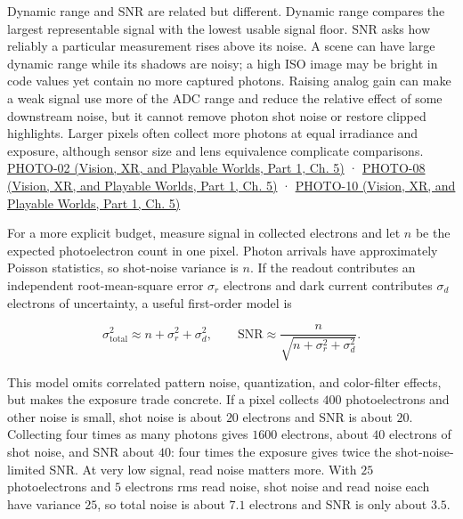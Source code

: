 Dynamic range and SNR are related but different. Dynamic range compares the largest representable signal with the lowest usable signal floor. SNR asks how reliably a particular measurement rises above its noise. A scene can have large dynamic range while its shadows are noisy; a high ISO image may be bright in code values yet contain no more captured photons. Raising analog gain can make a weak signal use more of the ADC range and reduce the relative effect of some downstream noise, but it cannot remove photon shot noise or restore clipped highlights. Larger pixels often collect more photons at equal irradiance and exposure, although sensor size and lens equivalence complicate comparisons. \href{../07-Vision-XR-and-Playable-Worlds-P01/main.pdf\#nameddest=04-visual-computing-ii-ch036-photo-02---photography-session-02}{PHOTO-02 (Vision, XR, and Playable Worlds, Part 1, Ch. 5)} · \href{../07-Vision-XR-and-Playable-Worlds-P01/main.pdf\#nameddest=04-visual-computing-ii-ch036-photo-08---photography-session-08}{PHOTO-08 (Vision, XR, and Playable Worlds, Part 1, Ch. 5)} · \href{../07-Vision-XR-and-Playable-Worlds-P01/main.pdf\#nameddest=04-visual-computing-ii-ch036-photo-10---photography-session-10}{PHOTO-10 (Vision, XR, and Playable Worlds, Part 1, Ch. 5)}

For a more explicit budget, measure signal in collected electrons and let \(n\) be the expected photoelectron count in one pixel. Photon arrivals have approximately Poisson statistics, so shot-noise variance is \(n\). If the readout contributes an independent root-mean-square error \(\sigma_r\) electrons and dark current contributes \(\sigma_d\) electrons of uncertainty, a useful first-order model is

\[
\sigma_{\mathrm{total}}^2\approx n+\sigma_r^2+\sigma_d^2,
\qquad
\mathrm{SNR}\approx\frac{n}{\sqrt{n+\sigma_r^2+\sigma_d^2}}.
\]

This model omits correlated pattern noise, quantization, and color-filter effects, but makes the exposure trade concrete. If a pixel collects \(400\) photoelectrons and other noise is small, shot noise is about \(20\) electrons and SNR is about \(20\). Collecting four times as many photons gives \(1600\) electrons, about \(40\) electrons of shot noise, and SNR about \(40\): four times the exposure gives twice the shot-noise-limited SNR. At very low signal, read noise matters more. With \(25\) photoelectrons and \(5\) electrons rms read noise, shot noise and read noise each have variance \(25\), so total noise is about \(7.1\) electrons and SNR is only about \(3.5\).

